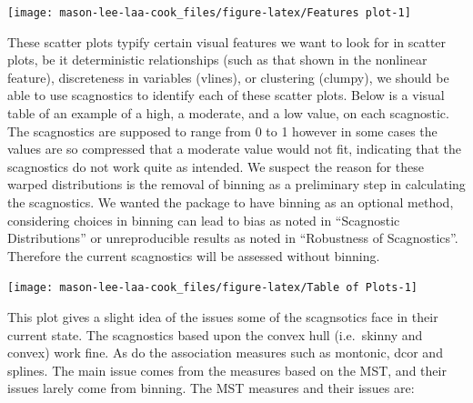 \begin{Schunk}

\texttt{[image: mason-lee-laa-cook\_files/figure-latex/Features plot-1]} \end{Schunk}

These scatter plots typify certain visual features we want to look for
in scatter plots, be it deterministic relationships (such as that shown
in the nonlinear feature), discreteness in variables (vlines), or
clustering (clumpy), we should be able to use scagnostics to identify
each of these scatter plots. Below is a visual table of an example of a
high, a moderate, and a low value, on each scagnostic. The scagnostics
are supposed to range from 0 to 1 however in some cases the values are
so compressed that a moderate value would not fit, indicating that the
scagnostics do not work quite as intended. We suspect the reason for
these warped distributions is the removal of binning as a preliminary
step in calculating the scagnostics. We wanted the package to have
binning as an optional method, considering choices in binning can lead
to bias as noted in ``Scagnostic Distributions'' or unreproducible
results as noted in ``Robustness of Scagnostics''. Therefore the current
scagnostics will be assessed without binning.

\begin{Schunk}

\texttt{[image: mason-lee-laa-cook\_files/figure-latex/Table of Plots-1]} \end{Schunk}

This plot gives a slight idea of the issues some of the scagnsotics face
in their current state. The scagnostics based upon the convex hull
(i.e.~skinny and convex) work fine. As do the association measures such
as montonic, dcor and splines. The main issue comes from the measures
based on the MST, and their issues larely come from binning. The MST
measures and their issues are:

